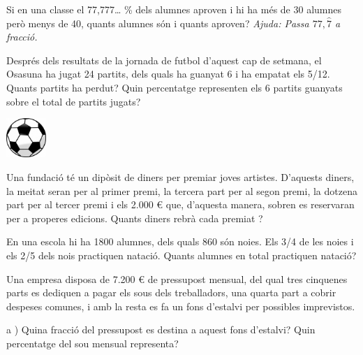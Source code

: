 \begin{mylist}
 
	\exer  Si en una classe el 77,777{\dots} \% dels alumnes aproven i hi ha més de 30 alumnes però menys de 40, quants alumnes són i quants aproven? \textit{Ajuda: Passa $77,\hat{7}$ a fracció.}
 


\vspace{-0.75cm}
	\exer  
	\begin{minipage}[t]{0.8\textwidth}
	Després dels resultats de la jornada de futbol d'aquest cap de setmana, el Osasuna ha jugat 24 partits, dels quals ha guanyat 6 i ha empatat els 5/12. Quants partits ha perdut? Quin percentatge representen els 6 partits guanyats sobre el total de partits jugats?
	\end{minipage}
	\begin{minipage}{0.2\textwidth}
		\centering
		\vspace{0.5cm}
		\includegraphics[width=1.5cm]{img-01/balon}
	\end{minipage}


	\exer  Una fundació té un dipòsit de diners per premiar joves artistes. D'aquests diners, la meitat seran per al primer premi, la tercera part per al segon premi, la dotzena part per al tercer premi i els 2.000 € que, d'aquesta manera, sobren es reservaran per a properes edicions. Quants diners rebrà cada premiat ?




	\exer  En una escola hi ha 1800 alumnes, dels quals 860 són noies. Els 3/4 de les noies i els 2/5 dels nois practiquen natació. Quants alumnes en total practiquen natació?




	\exer  Una empresa disposa de 7.200 € de pressupost mensual, del qual tres cinquenes parts es dediquen a pagar els sous dels treballadors, una quarta part a cobrir despeses comunes, i amb la resta es fa un fons d'estalvi per possibles imprevistos.


a ) Quina fracció del pressupost es destina a aquest fons d'estalvi? Quin percentatge del sou mensual representa?


\end{mylist}
